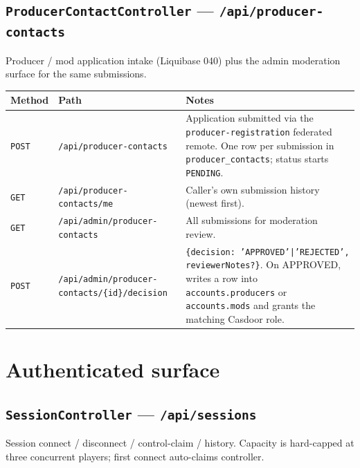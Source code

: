 \subsection{\texttt{ProducerContactController} — \texttt{/api/producer-contacts}}
Producer / mod application intake (Liquibase 040) plus the admin
moderation surface for the same submissions.

\begin{tabularx}{\linewidth}{l l X}
\toprule
\textbf{Method} & \textbf{Path} & \textbf{Notes} \\
\midrule
\texttt{POST} & \texttt{/api/producer-contacts} & Application submitted
via the \texttt{producer-registration} federated remote. One row per
submission in \texttt{producer\_contacts}; status starts
\texttt{PENDING}. \\
\texttt{GET}  & \texttt{/api/producer-contacts/me} & Caller's own
submission history (newest first). \\
\texttt{GET}  & \texttt{/api/admin/producer-contacts} & All submissions
for moderation review. \\
\texttt{POST} & \texttt{/api/admin/producer-contacts/\{id\}/decision} &
\texttt{\{decision: 'APPROVED'|'REJECTED', reviewerNotes?\}}. On
APPROVED, writes a row into \texttt{accounts.producers} or
\texttt{accounts.mods} and grants the matching Casdoor role. \\
\bottomrule
\end{tabularx}

\section{Authenticated surface}

\subsection{\texttt{SessionController} — \texttt{/api/sessions}}
Session connect / disconnect / control-claim / history. Capacity is hard-capped
at three concurrent players; first connect auto-claims controller.


